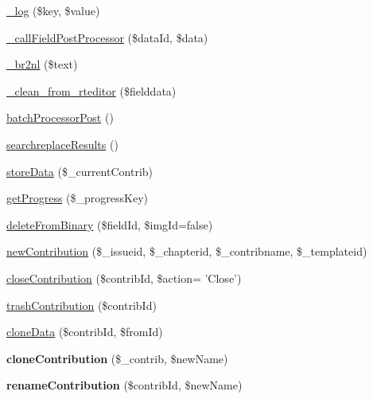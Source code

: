 \begin{DoxyCompactItemize}
\hyperlink{classrokfor___m_a_i_n_a4b4784a05bca8a01b27f3ee25f566440}{\-\_\-log} (\$key, \$value)
\item 
\hyperlink{classrokfor___m_a_i_n_a8971ff166acb28abd145835b6da8ce08}{\-\_\-call\-Field\-Post\-Processor} (\$data\-Id, \$data)
\item 
\hyperlink{classrokfor___m_a_i_n_adc268fde54755d66a26f0807a7b04f20}{\-\_\-br2nl} (\$text)
\item 
\hyperlink{classrokfor___m_a_i_n_a3a8dd047c1f7752070b39a1a965d7d2d}{\-\_\-clean\-\_\-from\-\_\-rteditor} (\$fielddata)
\item 
\hyperlink{classrokfor___m_a_i_n_aef520cb140311758a594ce364612bb98}{batch\-Processor\-Post} ()
\item 
\hyperlink{classrokfor___m_a_i_n_a49cccebc1ab3e44b29ee380426cc5df4}{searchreplace\-Results} ()
\item 
\hyperlink{classrokfor___m_a_i_n_a841c8ce1722294a2f0f64af9c1fad15e}{store\-Data} (\$\-\_\-current\-Contrib)
\item 
\hyperlink{classrokfor___m_a_i_n_a46af5cbcb18cecf9b03601dff685822b}{get\-Progress} (\$\-\_\-progress\-Key)
\item 
\hyperlink{classrokfor___m_a_i_n_a1dda80323563b94c9aa64c2f9aeb9548}{delete\-From\-Binary} (\$field\-Id, \$img\-Id=false)
\item 
\hyperlink{classrokfor___m_a_i_n_ac104c5f6a57a4004de30a5f4147233dd}{new\-Contribution} (\$\-\_\-issueid, \$\-\_\-chapterid, \$\-\_\-contribname, \$\-\_\-templateid)
\item 
\hyperlink{classrokfor___m_a_i_n_a171ce0054036d240503486316dfe850b}{close\-Contribution} (\$contrib\-Id, \$action= '\-Close')
\item 
\hyperlink{classrokfor___m_a_i_n_ab6d45a8d3520db55bdab9815714ee943}{trash\-Contribution} (\$contrib\-Id)
\item 
\hyperlink{classrokfor___m_a_i_n_a0262c8e7654b2c8a7fb60d7ad3ff8508}{clone\-Data} (\$contrib\-Id, \$from\-Id)
\item 
\hypertarget{classrokfor___m_a_i_n_ade16fa3b3f203e1e4176ed6dee1628b0}{
{\bfseries clone\-Contribution} (\$\-\_\-contrib, \$new\-Name)}
\label{classrokfor___m_a_i_n_ade16fa3b3f203e1e4176ed6dee1628b0}

\item 
\hypertarget{classrokfor___m_a_i_n_ae4dc9d76ac9c99c6fa9884436fc38c29}{
{\bfseries rename\-Contribution} (\$contrib\-Id, \$new\-Name)}
\label{classrokfor___m_a_i_n_ae4dc9d76ac9c99c6fa9884436fc38c29}


\end{DoxyCompactItemize}
